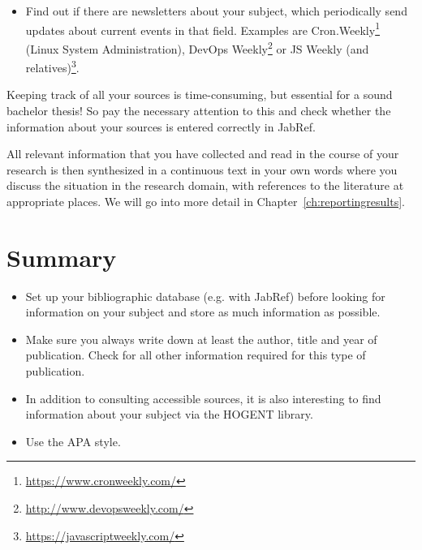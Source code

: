 \begin{itemize}
  \item Find out if there are newsletters about your subject, which periodically send updates about current events in that field. Examples are Cron.Weekly\footnote{\url{https://www.cronweekly.com/}} (Linux System Administration), DevOps Weekly\footnote{\url{http://www.devopsweekly.com/}} or JS Weekly (and relatives)\footnote{\url{https://javascriptweekly.com/}}.
\end{itemize}

Keeping track of all your sources is time-consuming, but essential for a sound bachelor thesis! So pay the necessary attention to this and check whether the information about your sources is entered correctly in JabRef.

All relevant information that you have collected and read in the course of your research is then synthesized in a continuous text in your own words where you discuss the situation in the research domain, with references to the literature at appropriate places. We will go into more detail in Chapter~\ref{ch:reportingresults}.

\section{Summary}
\label{sec:bibliography-summary}

\begin{itemize}
  \item Set up your bibliographic database (e.g. with JabRef) before looking for information on your subject and store as much information as possible.
  \item Make sure you always write down at least the author, title and year of publication. Check for all other information required for this type of publication.
  \item In addition to consulting accessible sources, it is also interesting to find information about your subject via the HOGENT library.
  \item Use the APA style.
\end{itemize}
